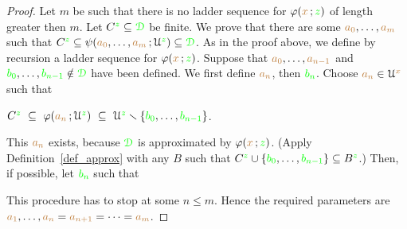 \begin{proof}
Let $m$ be such that there is no ladder sequence for $\varphi({\color{brown} x}\,;{\color{green} z})$ of length greater then $m$.
Let $C^{\color{green} z}\subseteq{\color{green}\EuScript D}$ be finite.
We prove that there are some ${\color{brown} a_0},\dots,{\color{brown} a_m}$ such that $C^{\color{green} z}\subseteq\psi({\color{brown} a_0},\dots,{\color{brown} a_m}\,;\EuScript U^{\color{green} z})\subseteq{\color{green}\EuScript D}$.
As in the proof above, we define by recursion a ladder sequence for $\varphi({\color{brown} x}\,;{\color{green} z})$.
Suppose that ${\color{brown} a_0},\dots,{\color{brown} a_{n-1}}$ and ${\color{green} b_0},\dots,{\color{green} b_{n-1}}\notin{\color{green}\EuScript D}$ have been defined.
We first define ${\color{brown} a_n}$, then ${\color{green} b_n}$. 
Choose ${\color{brown} a_n}\in\EuScript U^{\color{brown} x}$ such that 

\hfil$C^{\color{green} z}\ \subseteq\ \varphi({\color{brown} a_n}\,;\EuScript U^{\color{green} z})\ \subseteq\ \EuScript U^{\color{green} z}\smallsetminus\{{\color{green} b_0},\dots,{\color{green} b_{n-1}}\}$.

This ${\color{brown} a_n}$ exists, because ${\color{green}\EuScript D}$ is approximated by $\varphi({\color{brown} x}\,;{\color{green} z})$.
(Apply Definition~\ref{def_approx} with any $B$ such that $C^{\color{green} z}\cup\{{\color{green} b_0},\dots,{\color{green} b_{n-1}}\}\subseteq B^{\color{green} z}$.)
Then, if possible, let ${\color{green} b_n}$ such that


This procedure has to stop at some $n\le m$.
Hence the required parameters are ${\color{brown} a_1},\dots,{\color{brown} a_n}={\color{brown} a_{n+1}}=\dots={\color{brown} a_{m}}$.
\end{proof}






